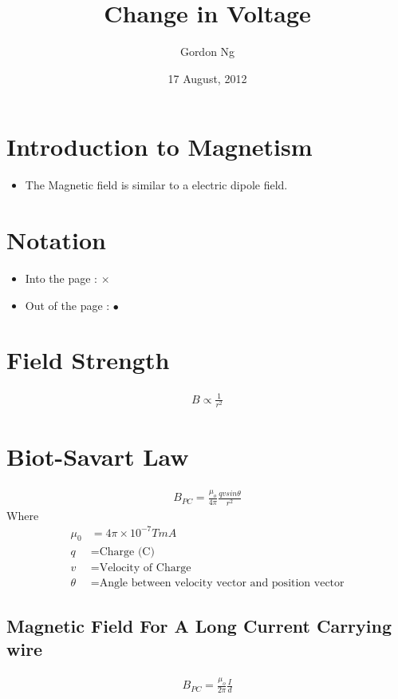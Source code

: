 \documentclass[12pt]{article}
\numberwithin{equation}{section}
\begin{document}
\title{Change in Voltage}
\date{17 August, 2012}
\author{Gordon Ng}
\maketitle
\pagebreak
\tableofcontents
\pagebreak
\section{Introduction to Magnetism}
\begin{itemize}
\item The Magnetic field is similar to a electric dipole field.
\end{itemize}

\section{Notation}
\begin{itemize}
\item Into the page : $\times$
\item Out of the page : $\bullet$
\end{itemize}
\section{Field Strength}
\begin{align}
B\propto \frac{1}{r^2}
\end{align}
\section{Biot-Savart Law}
\begin{align}
B_{PC}=\frac{\mu_o}{4 \pi} \frac{qv sin \theta}{r^2}
\end{align}
Where
\begin{align*}
\mu_0 &= 4 \pi \times 10^{-7} TmA \\
q &= \text{Charge (C)} \\
v &= \text{Velocity of Charge} \\
\theta &= \text{Angle between velocity vector and position vector} 
\end{align*}

\subsection{Magnetic Field For A Long Current Carrying wire}
\begin{align}
B_{PC}=\frac{\mu_o}{2 \pi}\frac{I}{d}
\end{align}
\end{document}
